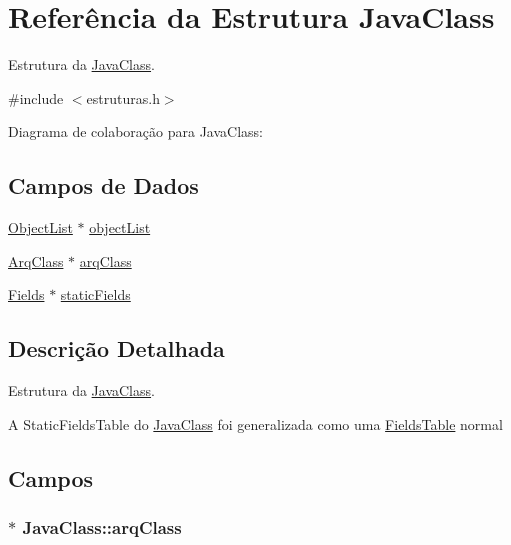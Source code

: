 \hypertarget{struct_java_class}{}\section{Referência da Estrutura Java\+Class}
\label{struct_java_class}


Estrutura da \hyperlink{struct_java_class}{Java\+Class}.  




{\ttfamily \#include $<$estruturas.\+h$>$}



Diagrama de colaboração para Java\+Class\+:
\subsection*{Campos de Dados}
\begin{DoxyCompactItemize}
\item 
\hyperlink{struct_object_list}{Object\+List} $\ast$ \hyperlink{struct_java_class_af33546b53017ca696367a08e9e30b115}{object\+List}
\item 
\hyperlink{estruturas_8h_a58bbd58859ab48cb1bd6c2ffb5874839}{Arq\+Class} $\ast$ \hyperlink{struct_java_class_a9957134e0b17228e4769414cd3e0debc}{arq\+Class}
\item 
\hyperlink{struct_fields}{Fields} $\ast$ \hyperlink{struct_java_class_a4ce091e3ddb1f607166c6e64c39cf53a}{static\+Fields}
\end{DoxyCompactItemize}


\subsection{Descrição Detalhada}
Estrutura da \hyperlink{struct_java_class}{Java\+Class}. 

A Static\+Fields\+Table do \hyperlink{struct_java_class}{Java\+Class} foi generalizada como uma \hyperlink{struct_fields_table}{Fields\+Table} normal 

\subsection{Campos}
\subsubsection[{\texorpdfstring{arq\+Class}{arqClass}}]{$\ast$ Java\+Class\+::arq\+Class}\hypertarget{struct_java_class_a9957134e0b17228e4769414cd3e0debc}{}\label{struct_java_class_a9957134e0b17228e4769414cd3e0debc}
